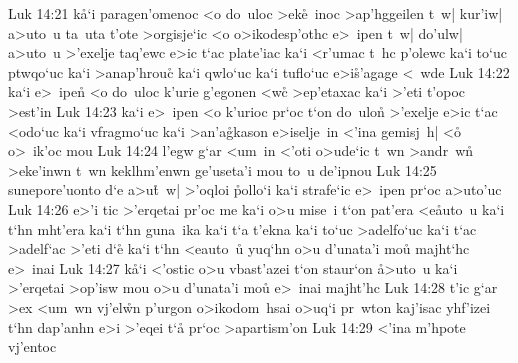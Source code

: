 \vs Luk 14:21
k\r{a}`i
paragen'omenoc
<o
do~uloc
>ek\r{e}~inoc
>ap'hggeilen
t~w|
kur'iw|
a>uto~u
ta~uta
t'ote
>orgisje`ic
<o
o>ikodesp'othc
e>~ipen
t~w|
do'ulw|
a>uto~u
>'exelje
taq'ewc
e>ic
t`ac
plate'iac
ka`i
<r'umac
t~hc
p'olewc
ka`i
to`uc
ptwqo`uc
ka`i
>anap'hrouc\r{}
ka`i
qwlo`uc
ka`i
tuflo`uc
e>i\r{s}'agage
<~wde\bibvsend
\vs Luk 14:22
ka`i
e>~ipen\r{}
<o
do~uloc
k'urie
g'egonen
<w\r{c}
>ep'etaxac
ka`i
>'eti
t'opoc
>est'in\bibvsend
\vs Luk 14:23
ka`i
e>~ipen
<o
k'urioc
pr`oc
t`on
do~ulo\r{n}
>'exelje
e>ic
t`ac
<odo`uc
ka`i
vfragmo`uc
ka`i
>an'a\r{g}kason
e>iselje~in
<'ina
gemisj~h|
<o\r{}
o>~ik'oc
mou\bibvsend
\vs Luk 14:24
l'egw
g`ar
<um~in
<'oti
o>ude`ic
t~wn
>andr~w\r{n}
>eke'inwn
t~wn
keklhm'enwn
ge'useta'i
mou
to~u
de'ipnou\bibvsend
\vs Luk 14:25
sunepore'uonto
d`e
a>u\r{t}~w|
>'oqloi
\r{p}ollo`i
ka`i
strafe`ic
e>~ipen
pr`oc
a>uto'uc\bibvsend
\vs Luk 14:26
e>'i
tic
>'erqetai
pr'oc
me
ka`i
o>u
mise~i
t`on
pat'era
<e\r{a}uto~u
ka`i
t`hn
mht'era
ka`i
t`hn
guna~ika
ka`i
t`a
t'ekna
ka`i
to`uc
>adelfo`uc
ka`i
t`ac
>adelf`ac
>'eti
d`e\r{}
ka`i
t`hn
<eauto~u\r{}
yuq`hn
o>u
d'unata'i
mou\r{}
majht`hc
e>~inai\bibvsend
\vs Luk 14:27
k\r{a}`i
<'ostic
o>u
vbast'azei
t`on
staur`on
\r{a}>uto~u
ka`i
>'erqetai
>op'isw
mou
o>u
d'unata'i
mou\r{}
e>~inai
majht'hc\bibvsend
\vs Luk 14:28
t'ic
g`ar
>ex
<um~wn
vj'el\r{w}n
p'urgon
o>ikodom~hsai
o>uq`i
pr~wton
kaj'isac
yhf'izei
t`hn
dap'anhn
e>i
>'eqei
t`a\r{}
pr`oc
>apartism'on\bibvsend
\vs Luk 14:29
<'ina
m'hpote
vj'entoc
